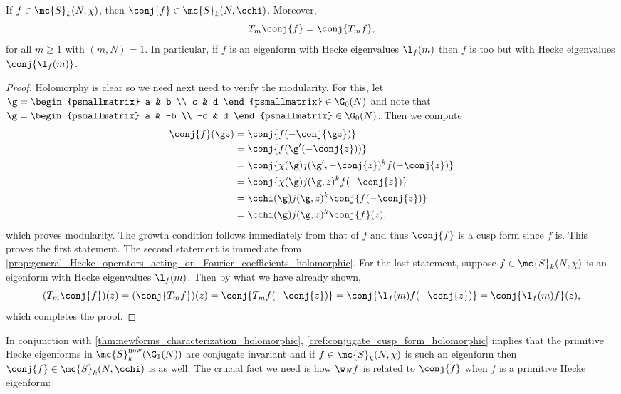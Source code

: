     \begin{proposition}\label{cref:conjugate_cusp_form_holomorphic}
      If $f \in \mc{S}_{k}(N,\chi)$, then $\conj{f} \in \mc{S}_{k}(N,\cchi)$. Moreover,
      \[
        T_{m}\conj{f} = \conj{T_{m}f},
      \]
      for all $m \ge 1$ with $(m,N) = 1$. In particular, if $f$ is an eigenform with Hecke eigenvalues $\l_{f}(m)$ then $f$ is too but with Hecke eigenvalues $\conj{\l_{f}(m)}$.
    \end{proposition}
    \begin{proof}
      Holomorphy is clear so we need next need to verify the modularity. For this, let $\g = \begin{psmallmatrix} a & b \\ c & d \end{psmallmatrix} \in \G_{0}(N)$ and note that $\g = \begin{psmallmatrix} a & -b \\ -c & d \end{psmallmatrix} \in \G_{0}(N)$. Then we compute
      \begin{align*}
        \conj{f}(\g z) &= \conj{f(-\conj{\g z})} \\
        &= \conj{f(\g'(-\conj{z}))} \\
        &= \conj{\chi(\g)j(\g',-\conj{z})^{k}f(-\conj{z})} \\
        &= \conj{\chi(\g)j(\g,z)^{k}f(-\conj{z})} \\
        &= \cchi(\g)j(\g,z)^{k}\conj{f(-\conj{z})} \\
        &= \cchi(\g)j(\g,z)^{k}\conj{f}(z),
      \end{align*}
      which proves modularity. The growth condition follows immediately from that of $f$ and thus $\conj{f}$ is a cusp form since $f$ is. This proves the first statement. The second statement is immediate from \cref{prop:general_Hecke_operators_acting_on_Fourier_coefficients_holomorphic}. For the last statement, suppose $f \in \mc{S}_{k}(N,\chi)$ is an eigenform with Hecke eigenvalues $\l_{f}(m)$. Then by what we have already shown,
      \[
        (T_{m}\conj{f})(z) = (\conj{T_{m}f})(z) = \conj{T_{m}f(-\conj{z})} = \conj{\l_{f}(m)f(-\conj{z})} = \conj{\l_{f}(m)f}(z),
      \]
      which completes the proof.
    \end{proof}
    
    In conjunction with \cref{thm:newforms_characterization_holomorphic}, \cref{cref:conjugate_cusp_form_holomorphic} implies that the primitive Hecke eigenforms in $\mc{S}_{k}^{\mathrm{new}}(\G_{1}(N))$ are conjugate invariant and if $f \in \mc{S}_{k}(N,\chi)$ is such an eigenform then $\conj{f} \in \mc{S}_{k}(N,\cchi)$ is as well. The crucial fact we need is how $\w_{N}f$ is related to $\conj{f}$ when $f$ is a primitive Hecke eigenform:

